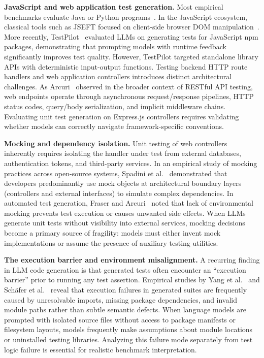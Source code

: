 \documentclass[11pt]{article}
\begin{document}
\textbf{JavaScript and web application test generation.}
Most empirical benchmarks evaluate Java or Python programs~\cite{fraser2011evosuite,lukasczyk2022pynguin,siddiq2024junit}. In the JavaScript ecosystem, classical tools such as JSEFT focused on client-side browser DOM manipulation~\cite{mirshokraie2015jseft}. More recently, TestPilot~\cite{schafer2024testpilot} evaluated LLMs on generating tests for JavaScript npm packages, demonstrating that prompting models with runtime feedback significantly improves test quality. However, TestPilot targeted standalone library APIs with deterministic input-output functions. Testing backend HTTP route handlers and web application controllers introduces distinct architectural challenges. As Arcuri~\cite{arcuri2019evomaster} observed in the broader context of RESTful API testing, web endpoints operate through asynchronous request/response pipelines, HTTP status codes, query/body serialization, and implicit middleware chains. Evaluating unit test generation on Express.js controllers requires validating whether models can correctly navigate framework-specific conventions.

\textbf{Mocking and dependency isolation.}
Unit testing of web controllers inherently requires isolating the handler under test from external databases, authentication tokens, and third-party services. In an empirical study of mocking practices across open-source systems, Spadini et al.~\cite{spadini2017mock} demonstrated that developers predominantly use mock objects at architectural boundary layers (controllers and external interfaces) to simulate complex dependencies. In automated test generation, Fraser and Arcuri~\cite{fraser2011evosuite} noted that lack of environmental mocking prevents test execution or causes unwanted side effects. When LLMs generate unit tests without visibility into external services, mocking decisions become a primary source of fragility: models must either invent mock implementations or assume the presence of auxiliary testing utilities.

\textbf{The execution barrier and environment misalignment.}
A recurring finding in LLM code generation is that generated tests often encounter an ``execution barrier'' prior to running any test assertion. Empirical studies by Yang et al.~\cite{yang2024evaluation} and Schäfer et al.~\cite{schafer2024testpilot} reveal that execution failures in generated suites are frequently caused by unresolvable imports, missing package dependencies, and invalid module paths rather than subtle semantic defects. When language models are prompted with isolated source files without access to package manifests or filesystem layouts, models frequently make assumptions about module locations or uninstalled testing libraries. Analyzing this failure mode separately from test logic failure is essential for realistic benchmark interpretation.
\end{document}

